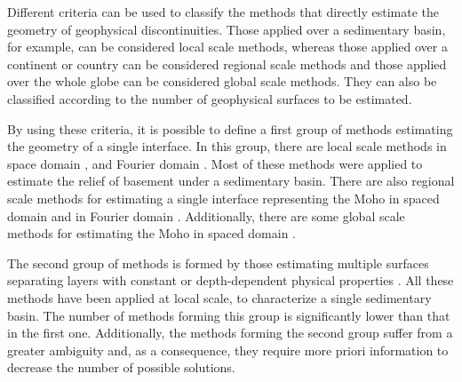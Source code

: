 \documentclass[manuscript]{geophysics}
\begin{document}
Different criteria can be used to classify the methods that directly estimate
the geometry of geophysical discontinuities.
Those applied over a sedimentary basin, for example, can be considered local scale methods,
whereas those applied over a continent or country can be considered regional scale methods
and those applied over the whole globe can be considered global scale methods.
They can also be classified according to the number of geophysical surfaces
to be estimated.

By using these criteria, it is possible to define a first group of methods
estimating the geometry of a single interface.
In this group, there are local scale methods in space domain
\citep[e.g.,][]{bott1960, tanner1967, cordell-henderson1968, dyrelius-vogel1972, pedersen1977,
pilkington-crossley1986, richardson-macinnes1989, barbosa-etal1997, 
barbosa-etal1999, barbosa-etal1999b, silva-etal2006, pilkington2006, 
chakravarthi-sundararajan2007, martins-etal2010, silva-etal2010, lima-etal2011, 
martins-etal2011, barnes-barraud2012, silva-etal2014, silva-santos2017},
and Fourier domain
\citep[e.g.,][]{oldenburg1974, granser1987, reamer-ferguson1989, guspi1993}.
Most of these methods were applied to estimate the relief of basement under
a sedimentary basin.
There are also regional scale methods for estimating a single interface 
representing the Moho in spaced domain 
\citep[e.g.,][]{shin-etal2009, bagherbandi-eshagh2012, barzaghi-biagi2014, sampietro2015, uieda-barbosa2017} and in Fourier domain 
\citep[e.g.,][]{braitenberg-etal1997, braitenberg-zadro1999, vandermeijde-etal2013}.
Additionally, there are some global scale methods for estimating the Moho
in spaced domain
\citep[e.g.,][]{sunkel1985, sjoberg2009}.

The second group of methods is formed by those estimating multiple surfaces
separating layers with constant or depth-dependent physical properties 
\citep[e.g.,][]{pilkington-crossley1986b, gallardo-etal2005, camacho-etal2011, 
salem-etal2014}.
All these methods have been applied at local scale, to characterize a single 
sedimentary basin.
The number of methods forming this group is significantly lower than that
in the first one.
Additionally, the methods forming the second group suffer from a greater 
ambiguity and, as a consequence, they require more priori information to
decrease the number of possible solutions.
\end{document}
